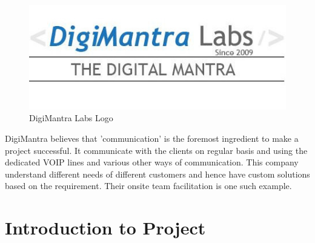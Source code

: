 \begin{figure}[h]
\centering \includegraphics[scale=0.9]{image/digimantra.png}
\caption[GNDEC]{DigiMantra Labs Logo}
\end{figure}
DigiMantra believes that 'communication' is the foremost ingredient to make a project successful. It communicate with the clients on regular basis and using the dedicated VOIP lines and various other ways of communication. 
This company understand different needs of different customers and hence have custom solutions based on the requirement. Their onsite team facilitation is one such example.

\pagebreak
\section{Introduction to Project}

